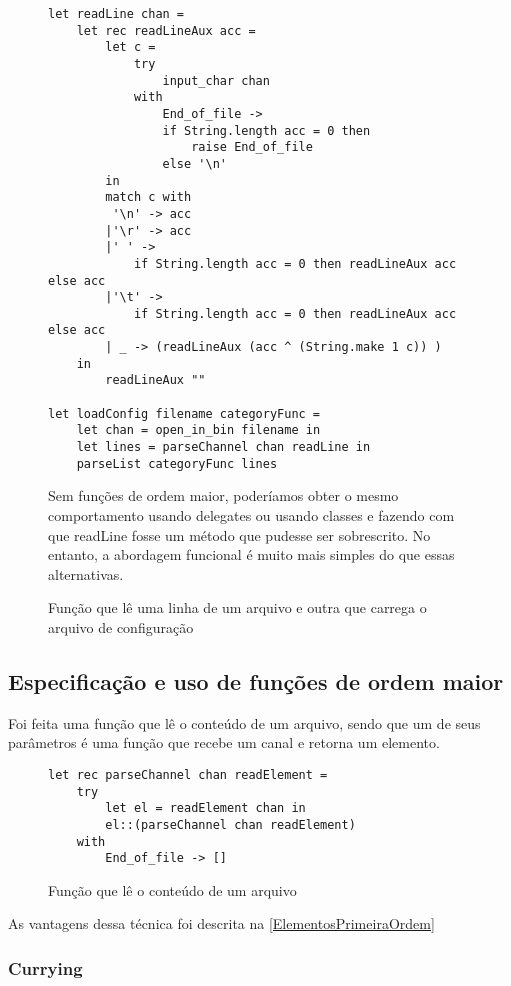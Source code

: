 \documentclass[a4paper,10pt]{article}
\begin{document}
	\begin{figure}[H]
	\centering	
	\begin{lstlisting}
let readLine chan =
	let rec readLineAux acc =
		let c =
			try
				input_char chan
			with
				End_of_file ->
				if String.length acc = 0 then
					raise End_of_file
				else '\n'
		in
		match c with
		 '\n' -> acc
		|'\r' -> acc
		|' ' ->
			if String.length acc = 0 then readLineAux acc else acc
		|'\t' ->
			if String.length acc = 0 then readLineAux acc else acc
		| _ -> (readLineAux (acc ^ (String.make 1 c)) )
	in
		readLineAux ""
		
let loadConfig filename categoryFunc =
	let chan = open_in_bin filename in
	let lines = parseChannel chan readLine in
	parseList categoryFunc lines
	\end{lstlisting}
	\caption{Função que lê uma linha de um arquivo e outra que carrega o arquivo de configuração}
	
	Sem funções de ordem maior, poderíamos obter o mesmo comportamento usando delegates ou usando classes e fazendo com que readLine fosse um método que pudesse ser sobrescrito. No entanto, a abordagem funcional é muito mais simples do que essas alternativas.
	
\end{figure}
	
\subsection{Especificação e uso de funções de ordem maior}

Foi feita uma função que lê o conteúdo de um arquivo, sendo que um de seus parâmetros é uma função que recebe um canal e retorna um elemento.

\begin{figure}[H]
	\centering	
	\begin{lstlisting}
let rec parseChannel chan readElement =
	try
		let el = readElement chan in
		el::(parseChannel chan readElement)
	with
		End_of_file -> []
	\end{lstlisting}
	\caption{Função que lê o conteúdo de um arquivo}
\end{figure}
	
	As vantagens dessa técnica foi descrita na \autoref{ElementosPrimeiraOrdem}
	
\subsubsection{Currying}
	
\end{document}
